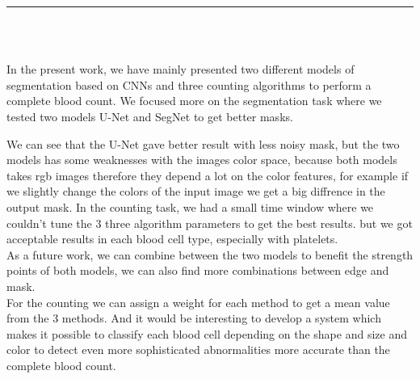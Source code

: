 \vspace*{0.2in}

\begin{center}
    {\color{Black} \rule{4in}{1.4mm} }\\
    \vspace{0.1in}
    \scshape{\fontsize{34}{46}{\bfseries{\color{Black}{Conclusion}}}}
    \\
    \vspace{0.6in}
\end{center}
\begin{changemargin}{0.9cm}{0.9cm}
\hspace*{0.16in}
\end{changemargin}

In the present work, we have mainly presented two different models of segmentation based on CNNs and three counting algorithms to perform a complete blood count.
We focused more on the segmentation task where  we tested two models U-Net and SegNet to get better masks. 

We can see that the U-Net gave better result with less noisy mask, but the two models has some weaknesses with the images color space, because both models takes rgb images therefore they depend a lot on the color features, for example if we slightly change the colors of the input image we get a big diffrence in the output mask.
In the counting task, we had a small time window where we couldn't tune the 3 three algorithm parameters to get the best results. but we got acceptable results in each blood cell type, especially with platelets.\\

As a future work, we can combine between the two models to benefit the strength points of both models, we can also find more combinations between edge and mask.\\
For the counting we can assign a weight for each  method to get a mean value from the 3 methods. And it would be interesting to develop a system which makes it possible to classify each blood cell depending on the shape and size and color to detect even more sophisticated abnormalities more accurate than the complete blood count.
